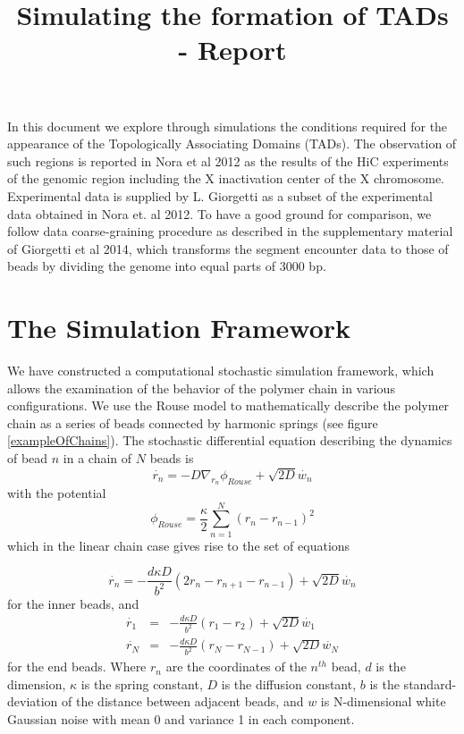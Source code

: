 \documentclass[12pt]{paper}
\begin{document}
\title{Simulating the formation of TADs - Report}
\maketitle
In this document we explore through simulations the conditions required for the appearance of the Topologically Associating Domains (TADs). The observation of such regions is reported in Nora et al 2012 as the results of the HiC experiments of the genomic region including the X inactivation center of the X chromosome. Experimental data is supplied by L. Giorgetti as a subset of the experimental data obtained in Nora et. al 2012. To have a good ground for comparison, we follow data coarse-graining procedure as described in the supplementary material of Giorgetti et al 2014, which transforms the segment encounter data to those of beads by dividing the genome into equal parts of 3000 bp.   



\tableofcontents
  
\section{The Simulation Framework}
We have constructed a computational stochastic simulation framework, which allows the examination of the behavior of the polymer chain in various configurations.
We use the Rouse model to mathematically describe the polymer chain as a series of beads connected by harmonic springs (see figure \ref{exampleOfChains}). The stochastic differential equation describing the dynamics of bead $n$ in a chain of $N$ beads is 
\begin{equation*}
\dot{r_n} = -D\nabla_{r_n}\phi_{Rouse}+\sqrt{2D}\dot{w_n}
\end{equation*}
with the potential 
\begin{equation*}
\phi_{Rouse}=\frac{\kappa}{2}\sum_{n=1}^N \left(r_n-r_{n-1}\right)^2
\end{equation*}
 which in the linear chain case gives rise to the set of equations

\begin{equation*}
\dot{r_n}= -\frac{d\kappa D}{b^2}\left(2r_n-r_{n+1}-r_{n-1}\right)+\sqrt{2D}\dot{w_n}
\end{equation*}
for the inner beads, and 
\begin{eqnarray*}
\dot{r_1} &=& -\frac{d\kappa D}{b^2}\left(r_1-r_{2}\right)+\sqrt{2D}\dot{w_1}\\
\dot{r_N} &=& -\frac{d\kappa D}{b^2}\left(r_N-r_{N-1}\right)+\sqrt{2D}\dot{w_N}
\end{eqnarray*} 
for the end beads. Where $r_n$ are the coordinates of the $n^{th}$ bead, $d$ is the dimension, $\kappa$ is the spring constant, $D$ is the diffusion constant, $b$ is the standard-deviation of the distance between adjacent beads, and $w$ is N-dimensional white Gaussian noise with mean 0 and variance 1 in each component. 
\end{document}
